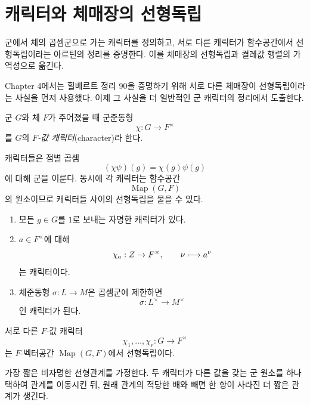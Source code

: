 \clearpage
\section{캐릭터와 체매장의 선형독립}
\label{sec:character-independence}

\begin{learninggoal}
군에서 체의 곱셈군으로 가는 캐릭터를 정의하고, 서로 다른 캐릭터가 함수공간에서 선형독립이라는 아르틴의 정리를 증명한다. 이를 체매장의 선형독립과 켤레값 행렬의 가역성으로 옮긴다.
\end{learninggoal}

Chapter 4에서는 힐베르트 정리 90을 증명하기 위해 서로 다른 체매장이 선형독립이라는 사실을 먼저 사용했다. 이제 그 사실을 더 일반적인 군 캐릭터의 정리에서 도출한다.

\begin{definition}[체값 캐릭터]
군 $G$와 체 $F$가 주어졌을 때 군준동형
\[
  \chi:G\longrightarrow F^\times
\]
를 $G$의 \emph{$F$-값 캐릭터}(character)라 한다.
\end{definition}

캐릭터들은 점별 곱셈
\[
  (\chi\psi)(g)=\chi(g)\psi(g)
\]
에 대해 군을 이룬다. 동시에 각 캐릭터는 함수공간
\[
  \operatorname{Map}(G,F)
\]
의 원소이므로 캐릭터들 사이의 선형독립을 물을 수 있다.

\begin{example}
\begin{enumerate}[label=(\roman*)]
  \item 모든 $g\in G$를 $1$로 보내는 자명한 캐릭터가 있다.
  \item $a\in F^\times$에 대해
  \[
    \chi_a:Z\to F^\times,\qquad
    \nu\longmapsto a^\nu
  \]
  는 캐릭터이다.
  \item 체준동형 $\sigma:L\to M$은 곱셈군에 제한하면
  \[
    \sigma:L^\times\to M^\times
  \]
  인 캐릭터가 된다.
\end{enumerate}
\end{example}

\begin{theorem}
\label{thm:artin-character-independence}
서로 다른 $F$-값 캐릭터
\[
  \chi_1,\dots,\chi_r:G\to F^\times
\]
는 $F$-벡터공간 $\operatorname{Map}(G,F)$에서 선형독립이다.
\end{theorem}

\begin{proofidea}
가장 짧은 비자명한 선형관계를 가정한다. 두 캐릭터가 다른 값을 갖는 군 원소를 하나 택하여 관계를 이동시킨 뒤, 원래 관계의 적당한 배와 빼면 한 항이 사라진 더 짧은 관계가 생긴다.
\end{proofidea}

